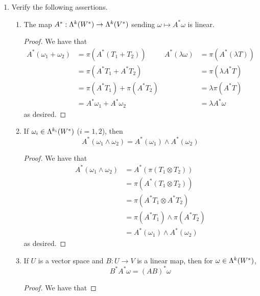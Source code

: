 \documentclass[../psets.tex]{subfiles}
\begin{document}
\begin{enumerate}[label={\textbf{1.8.\roman*.}}]
    \item Verify the following assertions.
    \begin{enumerate}
        \item The map $A^*:\lam[k]{W^*}\to\lam[k]{V^*}$ sending $\omega\mapsto A^*\omega$ is linear.
        \begin{proof}
            We have that
            \begin{align*}
                A^*(\omega_1+\omega_2) &= \pi(A^*(T_1+T_2))&
                    A^*(\lambda\omega) &= \pi(A^*(\lambda T))\\
                &= \pi(A^*T_1+A^*T_2)&
                    &= \pi(\lambda A^*T)\\
                &= \pi(A^*T_1)+\pi(A^*T_2)&
                    &= \lambda\pi(A^*T)\\
                &= A^*\omega_1+A^*\omega_2&
                    &= \lambda A^*\omega
            \end{align*}
            as desired.
        \end{proof}
        \item If $\omega_i\in\lam[k_i]{W^*}$ ($i=1,2$), then
        \begin{equation*}
            A^*(\omega_1\wedge\omega_2) = A^*(\omega_1)\wedge A^*(\omega_2)
        \end{equation*}
        \begin{proof}
            We have that
            \begin{align*}
                A^*(\omega_1\wedge\omega_2) &= A^*(\pi(T_1\otimes T_2))\\
                &= \pi(A^*(T_1\otimes T_2))\\
                &= \pi(A^*T_1\otimes A^*T_2)\\
                &= \pi(A^*T_1)\wedge\pi(A^*T_2)\\
                &= A^*(\omega_1)\wedge A^*(\omega_2)
            \end{align*}
            as desired.
        \end{proof}
        \item If $U$ is a vector space and $B:U\to V$ is a linear map, then for $\omega\in\lam[k]{W^*}$,
        \begin{equation*}
            B^*A^*\omega = (AB)^*\omega
        \end{equation*}
        \begin{proof}
            We have that

\end{proof}
\end{enumerate}
\end{enumerate}
\end{document}

